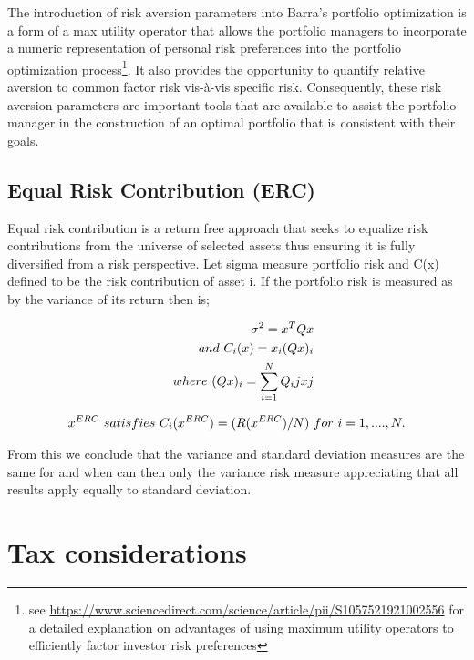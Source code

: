 \documentclass[12pt,preprint, authoryear]{elsarticle}
\numberwithin{equation}{section}
\numberwithin{figure}{section}
\numberwithin{table}{section}
\let\rmarkdownfootnote\footnote%
\def\footnote{\protect\rmarkdownfootnote}
\begin{document}
The introduction of risk aversion parameters into Barra's portfolio
optimization is a form of a max utility operator that allows the
portfolio managers to incorporate a numeric representation of personal
risk preferences into the portfolio optimization process\footnote{see
  \url{https://www.sciencedirect.com/science/article/pii/S1057521921002556}
  for a detailed explanation on advantages of using maximum utility
  operators to efficiently factor investor risk preferences}. It also
provides the opportunity to quantify relative aversion to common factor
risk vis-à-vis specific risk. Consequently, these risk aversion
parameters are important tools that are available to assist the
portfolio manager in the construction of an optimal portfolio that is
consistent with their goals.

\hypertarget{equal-risk-contribution-erc}{%
\subsection{Equal Risk Contribution
(ERC)}\label{equal-risk-contribution-erc}}

Equal risk contribution is a return free approach that seeks to equalize
risk contributions from the universe of selected assets thus ensuring it
is fully diversified from a risk perspective. Let sigma measure
portfolio risk and C(x) defined to be the risk contribution of asset i.
If the portfolio risk is measured as by the variance of its return then
is;

\begin{align}
\sigma^2 = x^TQ{x}\notag \\ and \ C_i(x)= x_i(Qx)_i \notag \\
\quad where\ (Qx)_i =\sum_{i = 1}^{N}Q_ijxj \notag
\end{align}

\begin{align}
x^{ERC} \ satisfies \ C_i(x^{ERC}) = (R(x^{ERC})/N) \ for \ i = 1,...., N. \notag
\end{align}

From this we conclude that the variance and standard deviation measures
are the same for and when can then only the variance risk measure
appreciating that all results apply equally to standard deviation.

\hypertarget{tax-considerations}{%
\section{Tax considerations}\label{tax-considerations}}
\end{document}

